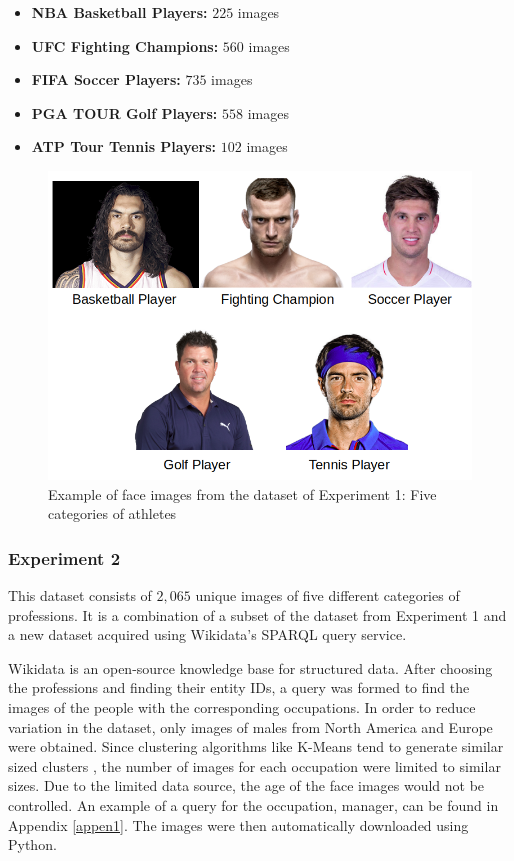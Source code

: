 \documentclass[12pt,english]{article}
\begin{document}
\begin{itemize}
\item \textbf{NBA Basketball Players: } $225$ images
\item \textbf{UFC Fighting Champions: } $560$ images
\item \textbf{FIFA Soccer Players: } $735$ images
\item \textbf{PGA TOUR Golf Players: } $558$ images
\item \textbf{ATP Tour Tennis Players: } $102$ images
\end{itemize}


\begin{figure}[!tbp]
 \centering
    \includegraphics[width=0.7\columnwidth]{figures/ex1.png}
    \caption{Example of face images from the dataset of Experiment 1: Five categories of athletes \cite{data1}}
	\label{fig:sport}
\end{figure}

\subsubsection{Experiment 2}
\label{experiment2}
\quad
This dataset consists of $2,065$ unique images of five different categories of professions. It is a combination of a subset of the dataset from Experiment 1 and a new dataset acquired using Wikidata's SPARQL query service. 

Wikidata is an open-source knowledge base for structured data. After choosing the professions and finding their entity IDs, a query was formed to find the images of the people with the corresponding occupations. In order to reduce variation in the dataset, only images of males from North America and Europe were obtained. Since clustering algorithms like K-Means tend to generate similar sized clusters \cite{shi}, the number of images for each occupation were limited to similar sizes. Due to the limited data source, the age of the face images would not be controlled. An example of a query for the occupation, manager, can be found in Appendix \ref{appen1}. The images were then automatically downloaded using Python. 
\end{document}
